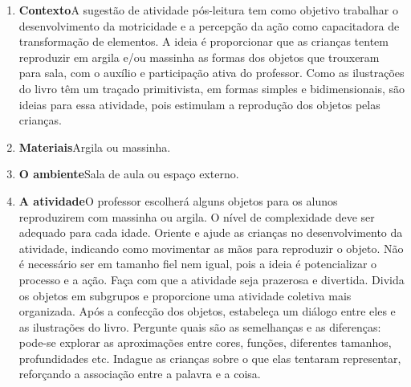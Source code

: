 \documentclass[11pt]{extarticle}
\begin{document}
\begin{enumerate}
\item \textbf{Contexto}\quad A sugestão de atividade pós-leitura tem como objetivo trabalhar o desenvolvimento da motricidade e a percepção da ação como capacitadora de transformação de elementos. A ideia é proporcionar que as crianças tentem reproduzir em argila e/ou massinha as formas dos objetos que trouxeram para sala, com o auxílio e participação ativa do professor.
Como as ilustrações do livro têm um traçado primitivista, em formas simples e bidimensionais, são ideias para essa atividade, pois estimulam a reprodução dos objetos pelas crianças.



\item \textbf{Materiais}\quad Argila ou massinha.

\item \textbf{O ambiente}\quad Sala de aula ou espaço externo.

\item \textbf{A atividade}\quad O professor escolherá alguns objetos para os alunos reproduzirem com massinha ou argila. O nível de complexidade deve ser adequado para cada idade. Oriente e ajude as crianças no desenvolvimento da atividade, indicando como movimentar as mãos para reproduzir o objeto. Não é necessário ser em tamanho fiel nem igual, pois a ideia é potencializar o processo e a ação. Faça com que a atividade seja prazerosa e divertida. Divida os objetos em subgrupos e proporcione uma atividade coletiva mais organizada. Após a confecção dos objetos, estabeleça um diálogo entre eles e as ilustrações do livro. Pergunte quais são as semelhanças e as diferenças: pode-se explorar as aproximações entre cores, funções, diferentes tamanhos, profundidades etc. Indague as crianças sobre o que elas tentaram representar, reforçando a associação entre a palavra e a coisa.


\end{enumerate}
\end{document}
